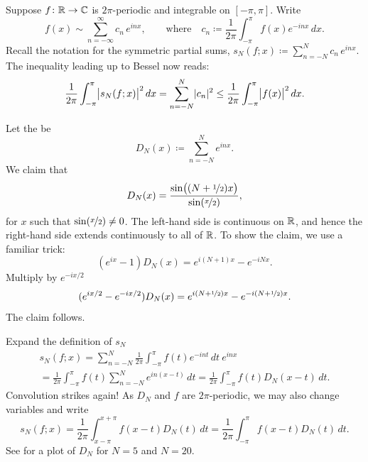 Suppose $f \colon {\mathbb{R}} \to {\mathbb{C}}$ is $2\pi$-periodic and integrable
on $[-\pi,\pi]$.
Write
\begin{equation*}
f(x) \sim
\sum_{n=-\infty}^\infty c_n \,e^{inx} ,
\qquad \text{where} \quad
c_n \coloneqq 
\frac{1}{2\pi} \int_{-\pi}^\pi
f(x) e^{-inx} \, dx .
\end{equation*}
Recall the notation for the symmetric partial sums,
$s_N(f;x) \coloneqq 
\sum_{n=-N}^N c_n \,e^{inx}$.
The inequality leading up to Bessel now reads:
\begin{equation*}
\frac{1}{2\pi} \int_{-\pi}^\pi
\bigl\lvert {s_N(f;x)} \bigr\rvert^2 \, dx =
\sum_{n=-N}^N \lvert {c_n} \rvert^2
\leq
\frac{1}{2\pi} \int_{-\pi}^\pi
\bigl\lvert {f(x)} \bigr\rvert^2
\, dx .
\end{equation*}

Let the \emph{} be
\begin{equation*}
D_N(x) \coloneqq \sum_{n=-N}^N e^{inx} .
\end{equation*}
We claim that
\begin{equation*}
D_N(x) =
\frac{\sin\bigl( (N+\nicefrac{1}{2})x \bigr)}{\sin(\nicefrac{x}{2})} ,
\end{equation*}
for $x$ such that $\sin(\nicefrac{x}{2}) \neq 0$.  The left-hand
side is continuous on ${\mathbb{R}}$, and hence the right-hand side extends continuously to
all of ${\mathbb{R}}$.
To show the claim,
we use a familiar trick:
\begin{equation*}
(e^{ix}-1) D_N(x) = e^{i(N+1)x} - e^{-iNx} .
\end{equation*}
Multiply by $e^{-ix/2}$
\begin{equation*}
(e^{ix/2}-e^{-ix/2}) D_N(x) = e^{i(N+\nicefrac{1}{2})x} -
e^{-i(N+\nicefrac{1}{2})x} .
\avoidbreak
\end{equation*}
The claim follows.

Expand the definition of $s_N$
\begin{multline*}
s_N(f;x) = 
\sum_{n=-N}^N \frac{1}{2\pi} \int_{-\pi}^\pi f(t) e^{-int}  \,  dt ~ e^{inx}
\\
=
\frac{1}{2\pi} \int_{-\pi}^\pi f(t) \sum_{n=-N}^N e^{in(x-t)} \, dt
=
\frac{1}{2\pi} \int_{-\pi}^\pi f(t) D_N(x-t) \, dt .
\end{multline*}
Convolution strikes again!
As $D_N$ and $f$ are $2\pi$-periodic, we may also change variables and write 
\begin{equation*}
s_N(f;x) = 
\frac{1}{2\pi} \int_{x-\pi}^{x+\pi} f(x-t) D_N(t) \, dt
=
\frac{1}{2\pi} \int_{-\pi}^\pi f(x-t) D_N(t) \, dt .
\end{equation*}
See  for a plot of $D_N$ for $N=5$ and $N=20$.

